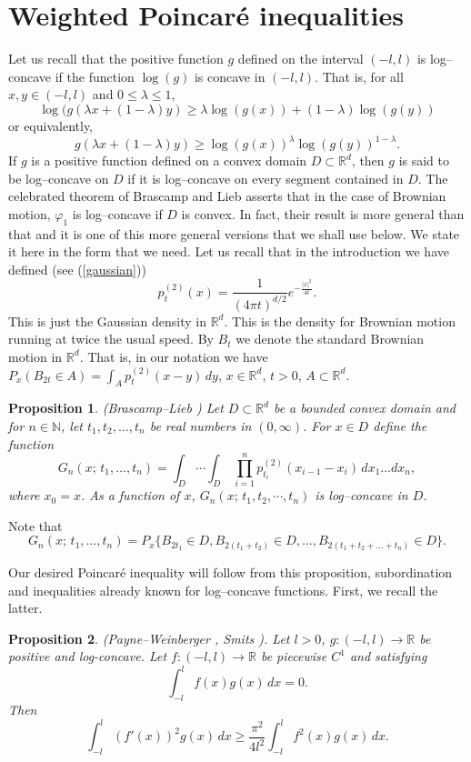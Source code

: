 \documentclass[11pt,leqno]{article}
\newtheorem{prop}{Proposition}[section]
\theoremstyle{definition}
\newcommand{\Rd}{\mathbb{R}^d}
\newcommand{\R}{\mathbb{R}}
\newcommand{\N}{\mathbb{N}}
\numberwithin{equation}{section}
\begin{document}
\section{Weighted Poincar\'e inequalities}


 Let us recall that the positive function $g$ defined on the interval $(-l, l)$ is log--concave if 
the function $\log(g)$ is concave in $(-l, l)$.  That is, for all $x, y\in (-l, l)$ and $0\leq \lambda\leq
1$, 
$$
\log(g(\lambda x+(1-\lambda) y)\geq \lambda \log(g(x)) +(1-\lambda)\log(g(y))
$$
or  equivalently, 
$$
g(\lambda x+(1-\lambda) y)\geq \log(g(x))^{\lambda}\log(g(y))^{1-\lambda}.
$$
If  $g$ is a positive function defined on a convex domain $D\subset \R^d$, then $g$ is said to be
log--concave on $D$ if it is log--concave on every segment contained in $D$.  The celebrated theorem
of Brascamp and Lieb \cite{BrLi} asserts that in the case of Brownian motion, $\varphi_1$ is
log--concave if
$D$ is convex.  In fact, their result is more general than that and it is one of this more general versions 
that we shall use below.  We  state it here in the form that we need. 
Let us recall that in the introduction we have defined (see  (\ref{gaussian}))  
$$
p_t^{(2)}(x)={\frac{1}{(4\pi t)^{d/2}}}e^{-\frac{|x|^2}{4t}}.
$$
This is just  the
Gaussian density in $\R^d$. This is the density for Brownian motion running at twice the usual speed. By $B_t$ we denote the standard Brownian motion in $\Rd$. That is, in our notation we have $P_x(B_{2t} \in A) = \int_{A} p_t^{(2)}(x - y) \, dy$, $x \in \Rd$, $t > 0$, $A \subset \Rd$. 

\begin{prop}\label{BrLi} (Brascamp--Lieb \cite {BrLi}) Let $D \subset \R^d$ be a bounded convex domain
and for
$n \in \N$, let
$t_1, t_2, \dots, t_n$ be  real numbers in $(0, \infty)$. For $x\in D$  define the function 
\begin{equation} G_n(x; \, t_1, \dots, t_n)= \int_D\cdots\int_D\, \prod_{i=1}^n
p_{t_i}^{(2)}(x_{i-1}-x_i)\,dx_1\ldots dx_n,
\end{equation}
where $x_0=x$.  As a function of $x$,   $G_n(x; \, t_1, t_2, \cdots, t_n)$ is log--concave in $D$. 
\end{prop}
Note that
$$
G_n(x; \, t_1, \dots, t_n)=P_x\{B_{2 t_1}\in D,
B_{2(t_1+t_2)}\in D, \dots, B_{2(t_1+t_2+\dots +t_n)}\in D\}.
$$
 
Our desired Poincar\'e inequality will follow from this proposition,  subordination and inequalities
already known for log--concave functions.  First, we recall the latter. 
\begin{prop}
\label{PWS1}
(Payne--Weinberger \cite{PW}, Smits \cite{Sm}). Let $l >0$, $g: (-l,l) \to \R$ be positive and
 log-concave. Let $f: (-l,l) \to \R$ be piecewise $C^1$ and satisfying 
$$ 
\int_{-l}^{l} f(x) g(x) \, dx = 0.
$$
Then 
$$
\int_{-l}^{l} (f'(x))^{2} g(x) \, dx \ge
\frac{\pi^{2}}{4 l^{2}} \int_{-l}^{l} f^{2}(x) g(x) \, dx.
$$
\end{prop}
\end{document}
